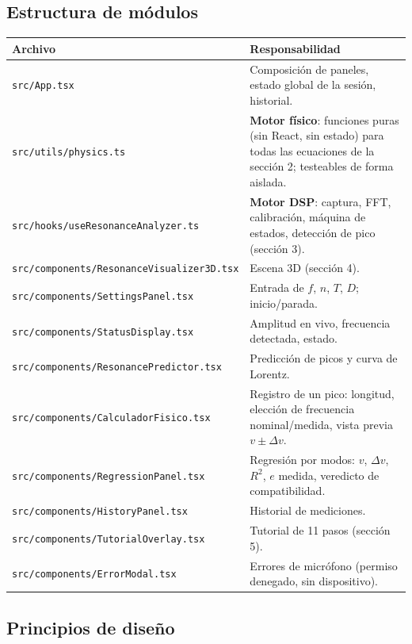 \documentclass[11pt,a4paper]{article}
\begin{document}
\subsection{Estructura de módulos}

\begin{center}
\begin{tabular}{@{}lp{9.2cm}@{}}
\toprule
Archivo & Responsabilidad \\
\midrule
\texttt{src/App.tsx} & Composición de paneles, estado global de la sesión, historial. \\
\texttt{src/utils/physics.ts} & \textbf{Motor físico}: funciones puras (sin React, sin
estado) para todas las ecuaciones de la sección 2; testeables de forma aislada. \\
\texttt{src/hooks/useResonanceAnalyzer.ts} & \textbf{Motor DSP}: captura, FFT, calibración,
máquina de estados, detección de pico (sección 3). \\
\texttt{src/components/ResonanceVisualizer3D.tsx} & Escena 3D (sección 4). \\
\texttt{src/components/SettingsPanel.tsx} & Entrada de $f$, $n$, $T$, $D$; inicio/parada. \\
\texttt{src/components/StatusDisplay.tsx} & Amplitud en vivo, frecuencia detectada, estado. \\
\texttt{src/components/ResonancePredictor.tsx} & Predicción de picos y curva de Lorentz. \\
\texttt{src/components/CalculadorFisico.tsx} & Registro de un pico: longitud, elección de
frecuencia nominal/medida, vista previa $v \pm \Delta v$. \\
\texttt{src/components/RegressionPanel.tsx} & Regresión por modos: $v$, $\Delta v$, $R^2$,
$e$ medida, veredicto de compatibilidad. \\
\texttt{src/components/HistoryPanel.tsx} & Historial de mediciones. \\
\texttt{src/components/TutorialOverlay.tsx} & Tutorial de 11 pasos (sección 5). \\
\texttt{src/components/ErrorModal.tsx} & Errores de micrófono (permiso denegado, sin
dispositivo). \\
\bottomrule
\end{tabular}
\end{center}

\subsection{Principios de diseño}
\end{document}
